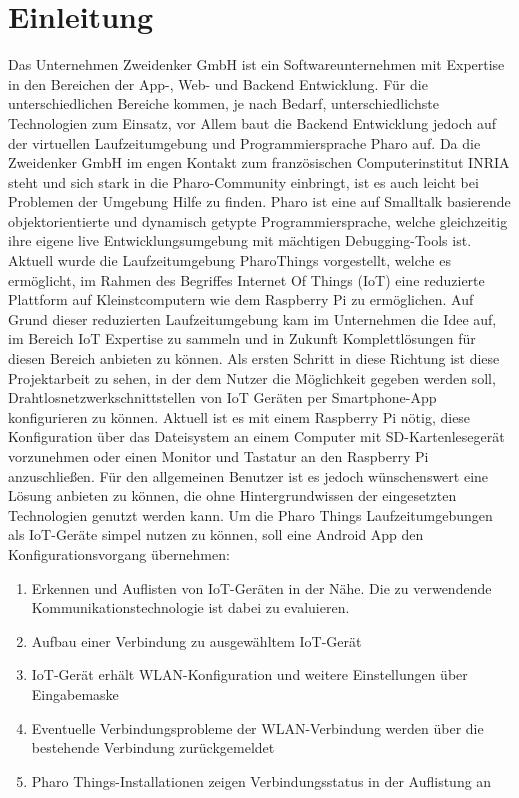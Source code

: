 \section{Einleitung}
	Das Unternehmen Zweidenker GmbH ist ein Softwareunternehmen mit Expertise in den Bereichen der App-, Web- und Backend Entwicklung.\cite{AI-zweidenker}
	Für die unterschiedlichen Bereiche kommen, je nach Bedarf, unterschiedlichste Technologien zum Einsatz, vor Allem baut die Backend Entwicklung jedoch auf der virtuellen Laufzeitumgebung und Programmiersprache Pharo auf.
	Da die Zweidenker GmbH im engen Kontakt zum französischen Computerinstitut INRIA steht und sich stark in die Pharo-Community einbringt, ist es auch leicht bei Problemen der Umgebung Hilfe zu finden. 
	Pharo ist eine auf Smalltalk basierende objektorientierte und dynamisch getypte Programmiersprache,
    welche gleichzeitig ihre eigene live Entwicklungsumgebung mit mächtigen Debugging-Tools ist.\cite{AI-pharo}
    Aktuell wurde die Laufzeitumgebung PharoThings \cite{AI-pharoThings} vorgestellt, welche es ermöglicht, im Rahmen des Begriffes Internet Of Things (IoT) eine reduzierte Plattform auf Kleinstcomputern wie dem Raspberry Pi zu ermöglichen.
    Auf Grund dieser reduzierten Laufzeitumgebung kam im Unternehmen die Idee auf, im Bereich IoT Expertise zu sammeln und in Zukunft Komplettlösungen für diesen Bereich anbieten zu können. Als ersten Schritt in diese Richtung ist diese Projektarbeit zu sehen, in der dem Nutzer die Möglichkeit gegeben werden soll, Drahtlosnetzwerkschnittstellen von IoT Geräten per Smartphone-App konfigurieren zu können. Aktuell ist es mit einem Raspberry Pi nötig, diese Konfiguration über das Dateisystem an einem Computer mit SD-Kartenlesegerät vorzunehmen oder einen Monitor und Tastatur an den Raspberry Pi anzuschließen. Für den allgemeinen Benutzer ist es jedoch wünschenswert eine Lösung anbieten zu können, die ohne Hintergrundwissen der eingesetzten Technologien genutzt werden kann.
    Um die Pharo Things Laufzeitumgebungen als IoT-Geräte simpel nutzen zu können, soll eine Android App den Konfigurationsvorgang übernehmen:
    \begin{enumerate}
        \item Erkennen und Auflisten von IoT-Geräten in der Nähe. Die zu verwendende Kommunikationstechnologie ist dabei zu evaluieren.
        \item Aufbau einer Verbindung zu ausgewähltem IoT-Gerät
        \item IoT-Gerät erhält WLAN-Konfiguration und weitere Einstellungen über Eingabemaske
        \item Eventuelle Verbindungsprobleme der WLAN-Verbindung werden über die bestehende Verbindung zurückgemeldet
        \item Pharo Things-Installationen zeigen Verbindungsstatus in der Auflistung an
    \end{enumerate}
